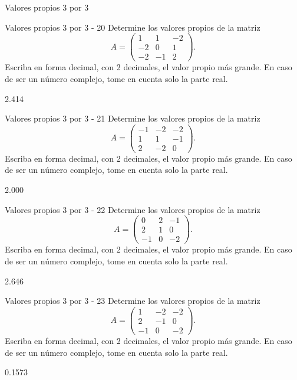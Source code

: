 \documentclass[a4,11pt]{aleph-notas}
\begin{document}
\begin{quiz}{Valores propios 3 por 3}
\begin{numerical}[tolerance=0.01]%
    {Valores propios 3 por 3 - 20}
    Determine los valores propios de la matriz
    \[
    A = \begin{pmatrix}
    1 & 1 & -2 \\
    -2 & 0 & 1 \\
    -2 & -1 & 2
    \end{pmatrix}.
    \]
    Escriba en forma decimal, con 2 decimales, el valor propio más grande. En caso de ser un número complejo, tome en cuenta solo la parte real.
    \item[] 2.414
\end{numerical}

\begin{numerical}[tolerance=0.01]%
    {Valores propios 3 por 3 - 21}
    Determine los valores propios de la matriz
    \[
    A = \begin{pmatrix}
    -1 & -2 & -2 \\
    1 & 1 & -1 \\
    2 & -2 & 0
    \end{pmatrix}.
    \]
    Escriba en forma decimal, con 2 decimales, el valor propio más grande. En caso de ser un número complejo, tome en cuenta solo la parte real.
    \item[] 2.000
\end{numerical}

\begin{numerical}[tolerance=0.01]%
    {Valores propios 3 por 3 - 22}
    Determine los valores propios de la matriz
    \[
    A = \begin{pmatrix}
    0 & 2 & -1 \\
    2 & 1 & 0 \\
    -1 & 0 & -2
    \end{pmatrix}.
    \]
    Escriba en forma decimal, con 2 decimales, el valor propio más grande. En caso de ser un número complejo, tome en cuenta solo la parte real.
    \item[] 2.646
\end{numerical}

\begin{numerical}[tolerance=0.01]%
    {Valores propios 3 por 3 - 23}
    Determine los valores propios de la matriz
    \[
    A = \begin{pmatrix}
    1 & -2 & -2 \\
    2 & -1 & 0 \\
    -1 & 0 & -2
    \end{pmatrix}.
    \]
    Escriba en forma decimal, con 2 decimales, el valor propio más grande. En caso de ser un número complejo, tome en cuenta solo la parte real.
    \item[] 0.1573
\end{numerical}


\end{quiz}
\end{document}
